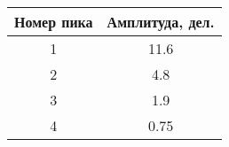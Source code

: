 \begin{tabular}{|c|c|}
\hline
Номер пика & Амплитуда, дел. \\ \hline
1 & 11.6 \\ \hline
2 & 4.8 \\ \hline
3 & 1.9 \\ \hline
4 & 0.75 \\ \hline
\end{tabular}
